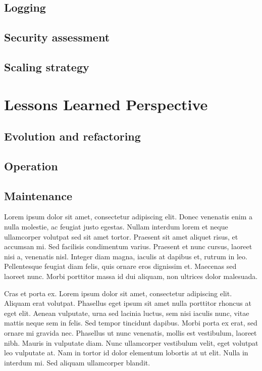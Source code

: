 \documentclass[12pt, a4paper, oneside]{book}
\begin{document}
\section{Logging}

\section{Security assessment}

\section{Scaling strategy}

\chapter{Lessons Learned Perspective}

\section{Evolution and refactoring}

\section{Operation}

\section{Maintenance}


Lorem ipsum dolor sit amet, consectetur adipiscing elit. Donec venenatis enim a nulla molestie, ac feugiat justo egestas. Nullam interdum lorem et neque ullamcorper volutpat sed sit amet tortor. Praesent sit amet aliquet risus, et accumsan mi. Sed facilisis condimentum varius. Praesent et nunc cursus, laoreet nisi a, venenatis nisl. Integer diam magna, iaculis at dapibus et, rutrum in leo. Pellentesque feugiat diam felis, quis ornare eros dignissim et. Maecenas sed laoreet nunc. Morbi porttitor massa id dui aliquam, non ultrices dolor malesuada.

Cras et porta ex. Lorem ipsum dolor sit amet, consectetur adipiscing elit. Aliquam erat volutpat. Phasellus eget ipsum sit amet nulla porttitor rhoncus at eget elit. Aenean vulputate, urna sed lacinia luctus, sem nisi iaculis nunc, vitae mattis neque sem in felis. Sed tempor tincidunt dapibus. Morbi porta ex erat, sed ornare mi gravida nec. Phasellus ut nunc venenatis, mollis est vestibulum, laoreet nibh. Mauris in vulputate diam. Nunc ullamcorper vestibulum velit, eget volutpat leo vulputate at. Nam in tortor id dolor elementum lobortis at ut elit. Nulla in interdum mi. Sed aliquam ullamcorper blandit.
\end{document}
